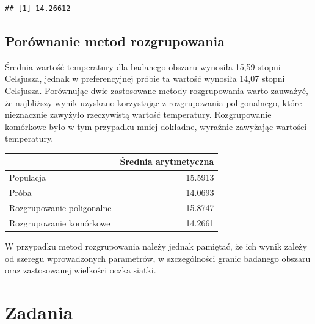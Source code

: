 \documentclass[
  paper=6in:9in,pagesize=pdftex,headinclude=on,footinclude=on,10pt]{scrbook}
\newenvironment{Shaded}{\begin{snugshade}}{\end{snugshade}}
\newcommand{\AttributeTok}[1]{\textcolor[rgb]{0.13,0.29,0.53}{#1}}
\newcommand{\ConstantTok}[1]{\textcolor[rgb]{0.56,0.35,0.01}{#1}}
\newcommand{\FunctionTok}[1]{\textcolor[rgb]{0.13,0.29,0.53}{\textbf{#1}}}
\newcommand{\NormalTok}[1]{#1}
\newcommand{\OtherTok}[1]{\textcolor[rgb]{0.56,0.35,0.01}{#1}}
\newcommand{\SpecialCharTok}[1]{\textcolor[rgb]{0.81,0.36,0.00}{\textbf{#1}}}
\begin{document}
\begin{Shaded}
\end{Shaded}

\begin{verbatim}
## [1] 14.26612
\end{verbatim}

\subsection{Porównanie metod rozgrupowania}\label{poruxf3wnanie-metod-rozgrupowania}

Średnia wartość temperatury dla badanego obszaru wynosiła 15,59 stopni Celsjusza, jednak w preferencyjnej próbie ta wartość wynosiła 14,07 stopni Celsjusza.
Porównując dwie zastosowane metody rozgrupowania warto zauważyć, że najbliższy wynik uzyskano korzystając z rozgrupowania poligonalnego, które nieznacznie zawyżyło rzeczywistą wartość temperatury.
Rozgrupowanie komórkowe było w tym przypadku mniej dokładne, wyraźnie zawyżając wartości temperatury.

\begin{tabular}{l|r}
\hline
  & Średnia arytmetyczna\\
\hline
Populacja & 15.5913\\
\hline
Próba & 14.0693\\
\hline
Rozgrupowanie poligonalne & 15.8747\\
\hline
Rozgrupowanie komórkowe & 14.2661\\
\hline
\end{tabular}

W przypadku metod rozgrupowania należy jednak pamiętać, że ich wynik zależy od szeregu wprowadzonych parametrów, w szczególności granic badanego obszaru oraz zastosowanej wielkości oczka siatki.

\section{Zadania}\label{z4}
\end{document}
